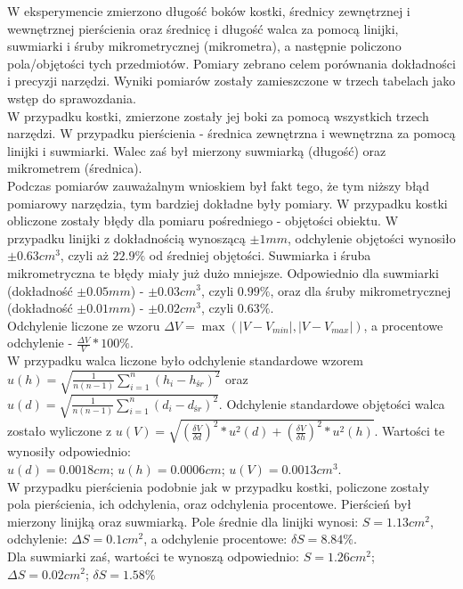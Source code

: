 \documentclass{article}
\begin{document}
{W eksperymencie zmierzono długość boków kostki, średnicy zewnętrznej i wewnętrznej pierścienia oraz średnicę i długość walca za pomocą linijki, suwmiarki i śruby mikrometrycznej (mikrometra), a następnie policzono pola/objętości tych przedmiotów. Pomiary zebrano celem porównania dokładności i precyzji narzędzi. Wyniki pomiarów zostały zamieszczone w trzech tabelach jako wstęp do sprawozdania. \\
W przypadku kostki, zmierzone zostały jej boki za pomocą wszystkich trzech narzędzi. W przypadku pierścienia - średnica zewnętrzna i wewnętrzna za pomocą linijki i suwmiarki. Walec zaś był mierzony suwmiarką (długość) oraz mikrometrem (średnica). \\
Podczas pomiarów zauważalnym wnioskiem był fakt tego, że tym niższy błąd pomiarowy narzędzia, tym bardziej dokładne były pomiary. W przypadku kostki obliczone zostały błędy dla pomiaru pośredniego - objętości obiektu. W przypadku linijki z dokładnością wynoszącą $\pm1mm$, odchylenie objętości wynosiło $\pm0.63cm^3$, czyli aż $22.9\%$ od średniej objętości.
Suwmiarka i śruba mikrometryczna te błędy miały już dużo mniejsze. Odpowiednio dla suwmiarki (dokładność $\pm0.05mm$) - $\pm0.03cm^3$, czyli $0.99\%$, oraz dla śruby mikrometrycznej (dokładność $\pm0.01mm$) - $\pm0.02cm^3$, czyli $0.63\%$. \\
Odchylenie liczone ze wzoru $\Delta V = \max(|V - V_{min}|, |V - V_{max}|)$, a procentowe odchylenie - $\frac{\Delta V}{V}*100\%$. \\
W przypadku walca liczone było odchylenie standardowe wzorem $u(h) = \sqrt{\frac{1}{n(n-1)}\sum_{i=1}^{n}(h_i-h_{śr})^2}$ oraz $u(d) = \sqrt{\frac{1}{n(n-1)}\sum_{i=1}^{n}(d_i-d_{śr})^2}$. Odchylenie standardowe objętości walca zostało wyliczone z $u(V) = \sqrt{(\frac{\delta V}{\delta d})^2*u^2(d)+(\frac{\delta V}{\delta h})^2*u^2(h)}$. Wartości te wynosiły odpowiednio: \\$u(d) = 0.0018cm$; $u(h) = 0.0006cm$; $u(V) = 0.0013cm^3$. \\
W przypadku pierścienia podobnie jak w przypadku kostki, policzone zostały pola pierścienia, ich odchylenia, oraz odchylenia procentowe. Pierścień był mierzony linijką oraz suwmiarką. Pole średnie dla linijki wynosi: $S = 1.13cm^2$, odchylenie: $\Delta S = 0.1cm^2$, a odchylenie procentowe: $\delta S = 8.84\%$. \\
Dla suwmiarki zaś, wartości te wynoszą odpowiednio: $S = 1.26cm^2$; $\Delta S = 0.02cm^2$; $\delta S = 1.58\%$}\\
\end{document}
